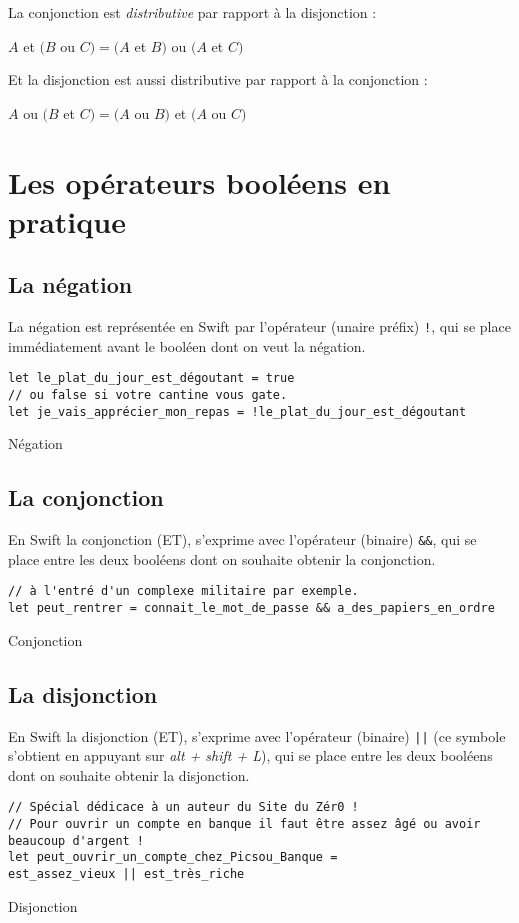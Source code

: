 La conjonction est \emph{distributive} par rapport à la disjonction :

$A$ et $(B$ ou $C) = (A$ et $B)$ ou $(A$ et $C)$

Et la disjonction est aussi distributive par rapport à la conjonction :

$A$ ou $(B$ et $C) = (A$ ou $B)$ et $(A$ ou $C)$

\section{Les opérateurs booléens en pratique}
\subsection{La négation}
La négation est représentée en Swift par l'opérateur (unaire préfix) \verb"!", qui se place immédiatement avant le booléen dont on veut la négation.
\begin{listing}[h]
\begin{verbatim}
let le_plat_du_jour_est_dégoutant = true
// ou false si votre cantine vous gate.
let je_vais_apprécier_mon_repas = !le_plat_du_jour_est_dégoutant
\end{verbatim}
\caption{Négation}
\end{listing}
\subsection{La conjonction}
En Swift la conjonction (ET), s'exprime avec l'opérateur (binaire) \verb"&&", qui se place entre les deux booléens dont on souhaite obtenir la conjonction.

\begin{listing}[h]
\begin{verbatim}
// à l'entré d'un complexe militaire par exemple.
let peut_rentrer = connait_le_mot_de_passe && a_des_papiers_en_ordre
\end{verbatim}
\caption{Conjonction}
\end{listing}
\subsection{La disjonction}
En Swift la disjonction (ET), s'exprime avec l'opérateur (binaire) \verb"||" (ce symbole s'obtient en appuyant sur \emph{alt + shift + L}), qui se place entre les deux booléens dont on souhaite obtenir la disjonction.

\begin{listing}[h]
\begin{verbatim}
// Spécial dédicace à un auteur du Site du Zér0 !
// Pour ouvrir un compte en banque il faut être assez âgé ou avoir beaucoup d'argent !
let peut_ouvrir_un_compte_chez_Picsou_Banque = 
est_assez_vieux || est_très_riche
\end{verbatim}
\caption{Disjonction}
\end{listing}

